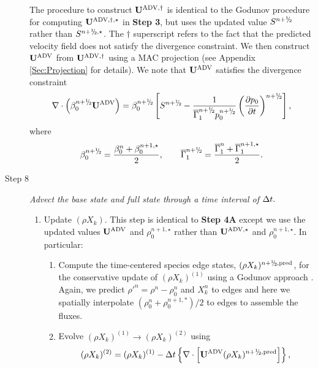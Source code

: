\begin{description}
The procedure to construct ${\bf{U}}^{\mathrm{ADV},\dagger}$ is identical to the Godunov procedure
for computing ${\bf{U}}^{\mathrm{ADV},\dagger,\star}$ in {\bf Step 3}, but uses
the updated value $S^{\nph}$ rather than $S^{\nph,\star}$.
The $\dagger$ superscript refers to the
fact that the predicted velocity field does not satisfy the divergence
constraint.  We then construct ${\bf{U}}^{\mathrm{ADV}}$ from ${\bf{U}}^{\mathrm{ADV},\dagger}$
using a MAC projection (see Appendix \ref{Sec:Projection} for details).
We note that ${\bf{U}}^{\mathrm{ADV}}$ satisfies the divergence constraint
\begin{equation}
\nabla \cdot \left(\beta_0^{\nph} \uadvtwo\right) =
\beta_0^{\nph} \left[S^{\nph} - \frac{1}{\gammaonebar^{\nph}p_0^{\nph}}\left(\frac{\partial p_0}{\partial t}\right)^{\nph}\right],\label{eq:div2}
\end{equation}
where
\begin{equation}
\beta_0^{\nph} = \frac{ \beta_0^n +  \beta_0^{n+1,\star} }{2},
\qquad
\gammaonebar^{\nph} = \frac{ \gammaonebar^n +  \gammaonebar^{n+1,\star} }{2}.
\end{equation}

\item[Step 8] {\em Advect the base state and full state through a time interval of $\Delta t.$}

\begin{enumerate}
\renewcommand{\theenumi}{{\bf \Alph{enumi}}}

\item Update $(\rho X_k)$.  This step is identical to {\bf Step 4A} except we use
  the updated values ${\bf{U}}^{\mathrm{ADV}}$ and $\rho_0^{n+1,\star}$ rather than
  ${\bf{U}}^{\mathrm{ADV},\star}$ and $\rho_0^{n+1,\star}$.  In particular:

\begin{enumerate}
\renewcommand{\labelenumii}{{\bf \roman{enumii}}.}

\item Compute the time-centered species edge states, $(\rho X_k)^{\nph,\pred}$,
  for the conservative update of $(\rho X_k)^{(1)}$ using a Godunov approach \citep{XRB_III}.
  Again, we predict $\rho'^n=\rho^n-\rho_0^n$ and $X_k^n$ to edges
  and here we spatially interpolate $(\rho_0^n+\rho_0^{n+1,*})/2$ to edges to assemble the fluxes.


\item Evolve $(\rho X_k)^{(1)} \rightarrow (\rho X_k)^{(2)}$ using
\begin{equation}
(\rho X_k)^{(2)} = (\rho X_k)^{(1)}
- \dt \left\{ \nabla \cdot \left[\uadvtwo (\rho X_k)^{\nph,\pred} \right] \right\},
\end{equation}


\end{enumerate}
\end{enumerate}
\end{description}
